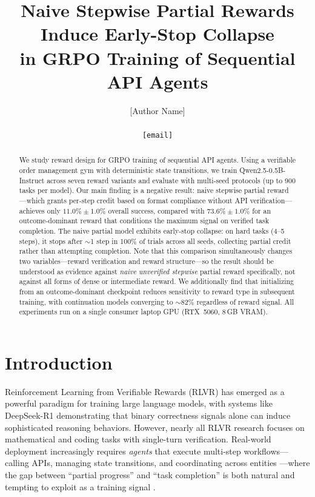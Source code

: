 \documentclass[11pt]{article}
\title{Naive Stepwise Partial Rewards Induce Early-Stop Collapse\\in GRPO Training of Sequential API Agents}
\author{
  [Author Name]\\
  [Affiliation]\\
  \texttt{[email]}
}
\date{}
\begin{document}
\maketitle

\begin{abstract}
We study reward design for GRPO training of sequential API agents.
Using a verifiable order management gym with deterministic state transitions, we train Qwen2.5-0.5B-Instruct across seven reward variants and evaluate with multi-seed protocols (up to 900 tasks per model).
Our main finding is a negative result: naive stepwise partial reward---which grants per-step credit based on format compliance without API verification---achieves only $11.0\% \pm 1.0\%$ overall success, compared with $73.6\% \pm 1.0\%$ for an outcome-dominant reward that conditions the maximum signal on verified task completion.
The naive partial model exhibits early-stop collapse: on hard tasks (4--5 steps), it stops after $\sim$1 step in 100\% of trials across all seeds, collecting partial credit rather than attempting completion.
Note that this comparison simultaneously changes two variables---reward verification and reward structure---so the result should be understood as evidence against \emph{naive unverified stepwise} partial reward specifically, not against all forms of dense or intermediate reward.
We additionally find that initializing from an outcome-dominant checkpoint reduces sensitivity to reward type in subsequent training, with continuation models converging to $\sim$82\% regardless of reward signal.
All experiments run on a single consumer laptop GPU (RTX~5060, 8\,GB VRAM).
\end{abstract}

\section{Introduction}
\label{sec:intro}

Reinforcement Learning from Verifiable Rewards (RLVR) has emerged as a powerful paradigm for training large language models, with systems like DeepSeek-R1 \citep{deepseek2025r1} demonstrating that binary correctness signals alone can induce sophisticated reasoning behaviors.
However, nearly all RLVR research focuses on mathematical \citep{shao2024deepseekmath,hendrycks2021math,cobbe2021gsm8k} and coding tasks with single-turn verification.
Real-world deployment increasingly requires \emph{agents} that execute multi-step workflows---calling APIs, managing state transitions, and coordinating across entities \citep{yao2024taubench,agentr1,agentrl2025}---where the gap between ``partial progress'' and ``task completion'' is both natural and tempting to exploit as a training signal \citep{casper2023rewardhacking}.
\end{document}
